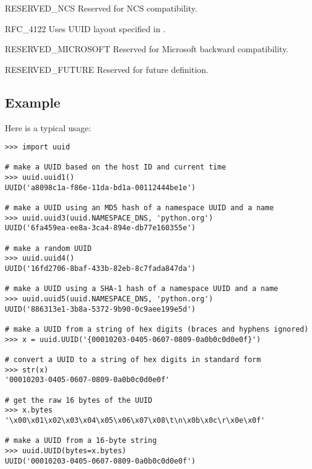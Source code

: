 \begin{datadesc}{RESERVED_NCS}
Reserved for NCS compatibility.
\end{datadesc}

\begin{datadesc}{RFC_4122}
Uses UUID layout specified in .
\end{datadesc}

\begin{datadesc}{RESERVED_MICROSOFT}
Reserved for Microsoft backward compatibility.
\end{datadesc}

\begin{datadesc}{RESERVED_FUTURE}
Reserved for future definition.
\end{datadesc}


\begin{seealso}
\end{seealso}

\subsection{Example \label{uuid-example}}

Here is a typical usage:
\begin{verbatim}
>>> import uuid

# make a UUID based on the host ID and current time
>>> uuid.uuid1()
UUID('a8098c1a-f86e-11da-bd1a-00112444be1e')

# make a UUID using an MD5 hash of a namespace UUID and a name
>>> uuid.uuid3(uuid.NAMESPACE_DNS, 'python.org')
UUID('6fa459ea-ee8a-3ca4-894e-db77e160355e')

# make a random UUID
>>> uuid.uuid4()
UUID('16fd2706-8baf-433b-82eb-8c7fada847da')

# make a UUID using a SHA-1 hash of a namespace UUID and a name
>>> uuid.uuid5(uuid.NAMESPACE_DNS, 'python.org')
UUID('886313e1-3b8a-5372-9b90-0c9aee199e5d')

# make a UUID from a string of hex digits (braces and hyphens ignored)
>>> x = uuid.UUID('{00010203-0405-0607-0809-0a0b0c0d0e0f}')

# convert a UUID to a string of hex digits in standard form
>>> str(x)
'00010203-0405-0607-0809-0a0b0c0d0e0f'

# get the raw 16 bytes of the UUID
>>> x.bytes
'\x00\x01\x02\x03\x04\x05\x06\x07\x08\t\n\x0b\x0c\r\x0e\x0f'

# make a UUID from a 16-byte string
>>> uuid.UUID(bytes=x.bytes)
UUID('00010203-0405-0607-0809-0a0b0c0d0e0f')
\end{verbatim}
